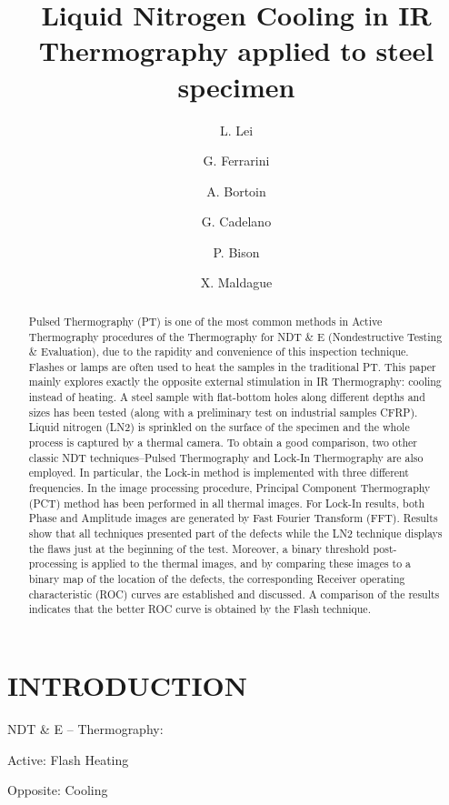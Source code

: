 \documentclass[]{spie}  %
\title{Liquid Nitrogen Cooling in IR Thermography applied to steel specimen}
\author[a]{L. Lei}
\author[b]{G. Ferrarini}
\author[b]{A. Bortoin}
\author[b]{G. Cadelano}
\author[b]{P. Bison}
\author[a]{X. Maldague}
\affil[a]{LVSN, University Laval, 1065 avenue de la Médecine, Québec (Québec) G1V 0A6 Canada}
\affil[b]{CNR-ITC, Corso Stati Uniti 4, 35127 Padova PD, Italy}
\begin{document}
 
\maketitle

\begin{abstract}
Pulsed Thermography (PT) is one of the most common methods in Active Thermography procedures of the Thermography for NDT \& E (Nondestructive Testing \& Evaluation), due to the rapidity and convenience of this inspection technique. Flashes or lamps are often used to heat the samples in the traditional PT. This paper mainly explores exactly the opposite external stimulation in IR Thermography: cooling instead of heating. A steel sample with flat-bottom holes along different depths and sizes has been tested (along with a preliminary test on industrial samples CFRP). Liquid nitrogen (LN2) is sprinkled on the surface of the specimen and the whole process is captured by a thermal camera. To obtain a good comparison, two other classic NDT techniques--Pulsed Thermography and Lock-In Thermography are also employed. In particular, the  Lock-in  method  is  implemented  with  three  different  frequencies.  In  the  image  processing  procedure,  Principal Component Thermography (PCT) method has been performed in all thermal images. For Lock-In results, both Phase and Amplitude images are generated by Fast Fourier Transform (FFT). Results show that all techniques presented part of the defects while the LN2 technique displays the flaws just at the beginning of the test. Moreover, a binary threshold post-processing is applied to the thermal images, and by comparing these images to a binary map of the location of the defects, the corresponding Receiver operating characteristic (ROC) curves are established and discussed. A comparison of the results indicates that the better ROC curve is obtained by the Flash technique.   
\end{abstract}


\section{INTRODUCTION}
\label{sec:introduction}  %
NDT \& E -- Thermography:

Active: Flash Heating

Opposite: Cooling
\end{document}
